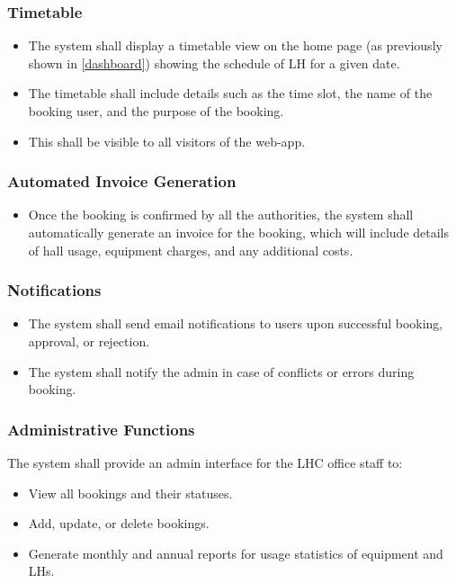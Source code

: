 \documentclass[a4paper,12pt]{article}
\begin{document}
\subsubsection{Timetable}
\begin{itemize} 
    \item The system shall display a timetable view on the home page (as previously shown in \ref{dashboard}) showing the schedule of LH for a given date.
    \item The timetable shall include details such as the time slot, the name of the booking user, and the purpose of the booking.
    \item This shall be visible to all visitors of the web-app.
\end{itemize}

\subsubsection{Automated Invoice Generation}
\begin{itemize} 
    \item Once the booking is confirmed by all the authorities, the system shall automatically generate an invoice for the booking, which will include details of hall usage, equipment charges, and any additional costs.
\end{itemize}

\subsubsection{Notifications}
\begin{itemize} 
    \item The system shall send email notifications to users upon successful booking, approval, or rejection.
    \item The system shall notify the admin in case of conflicts or errors during booking.
\end{itemize}

\subsubsection{Administrative Functions}
The system shall provide an admin interface for the LHC office staff to:
    \begin{itemize} 
        \item View all bookings and their statuses.
        \item Add, update, or delete bookings.
        \item Generate monthly and annual reports for usage statistics of equipment and LHs.
    \end{itemize}
\end{document}
